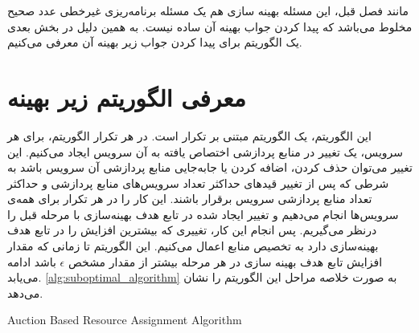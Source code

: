     مانند فصل قبل، این مسئله بهینه سازی هم یک مسئله برنامه‌ریزی غیرخطی عدد صحیح مخلوط می‌باشد که پیدا کردن جواب بهینه آن ساده نیست.
    به همین دلیل در بخش بعدی یک الگوریتم برای پیدا کردن جواب زیر بهینه آن معرفی می‌کنیم.

  \section{معرفی الگوریتم زیر بهینه}
    این الگوریتم، یک الگوریتم مبتنی بر تکرار است.
    در هر تکرار الگوریتم، برای هر سرویس، یک تغییر در منابع پردازشی اختصاص یافته به آن سرویس ایجاد می‌کنیم.
    این تغییر می‌توان حذف کردن، اضافه کردن یا جابه‌جایی منابع پردازشی آن سرویس باشد به شرطی که پس از تغییر قید‌های حداکثر تعداد سرویس‌های منابع پردازشی و حداکثر تعداد منابع پردازشی سرویس برقرار باشند.
    این کار را در هر تکرار برای همه‌ی سرویس‌ها انجام می‌دهیم و تغییر ایجاد شده در تابع هدف بهینه‌سازی با مرحله قبل را درنظر می‌گیریم.
    پس انجام این کار، تغییری که بیشترین افزایش را در تابع هدف بهینه‌سازی دارد به تخصیص منابع اعمال می‌کنیم.
    این الگوریتم تا زمانی که مقدار افزایش تابع هدف بهینه سازی در هر مرحله بیشتر از مقدار مشخص $\epsilon$ باشد ادامه می‌یابد.
    \cref{alg:suboptimal_algorithm} به صورت خلاصه مراحل این الگوریتم را نشان می‌دهد.

    \begin{latin}
      \begin{algorithm}[t]
        \caption{Auction ‌Based Resource Assignment Algorithm}
        \label{alg:suboptimal_algorithm}
        \begin{algorithmic}[1]
          \While{$\nu > \epsilon$}
                    \EndIf
                  \EndIf
                \EndIf
              \EndFor
            \EndFor
          \EndWhile
        \end{algorithmic}
      \end{algorithm}
    \end{latin}

